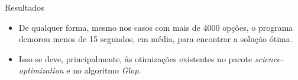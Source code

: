 \documentclass{beamer}
\begin{document}
\begin{frame}{Resultados}
\begin{itemize}
\item De qualquer forma, mesmo nos casos com mais de 4000 opções, o programa demorou menos de 15 segundos, em média, para encontrar a solução ótima. \pause
\item Isso se deve, principalmente, às otimizações existentes no pacote \emph{science-optimization} e no algoritmo \emph{Glop}.
\end{itemize}
\end{frame}
\end{document}
